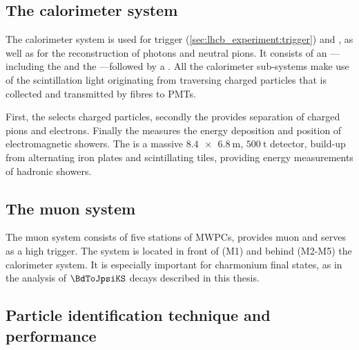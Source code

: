 \subsection{The calorimeter system}
\label{sec:lhcb_experiment:pid:calo}

The \LHCb calorimeter system is used for trigger
(\cref{sec:lhcb_experiment:trigger}) and \PID, as well as for the reconstruction
of photons and neutral pions. It consists of an
\ECAL---including the \SPD and the \PS---followed by a \HCAL. All the
calorimeter sub-systems make use of the scintillation light originating from
traversing charged particles that is collected and transmitted by fibres to
\acp{PMT}.

First, the \SPD selects charged particles, secondly the \PS provides separation
of charged pions and electrons. Finally the \ECAL measures the energy deposition
and position of electromagnetic showers. The \HCAL is a massive
$\SI[product-units = power]{8.4 x 6.8}{\metre}$, $\SI{500}{\tonne}$
detector, build-up from alternating iron plates and scintillating tiles,
providing energy measurements of hadronic showers.

\subsection{The muon system}
\label{sec:lhcb_experiment:pid:muon}

The muon system consists of five stations of \acp{MWPC}, provides muon \PID and
serves as a high \pT trigger. The system is located in front of (M1) and behind
(M2-M5) the calorimeter system. It is especially important for charmonium final
states, as in the analysis of $\BdToJpsiKS$ decays described in this thesis.

\subsection{Particle identification technique and performance}

